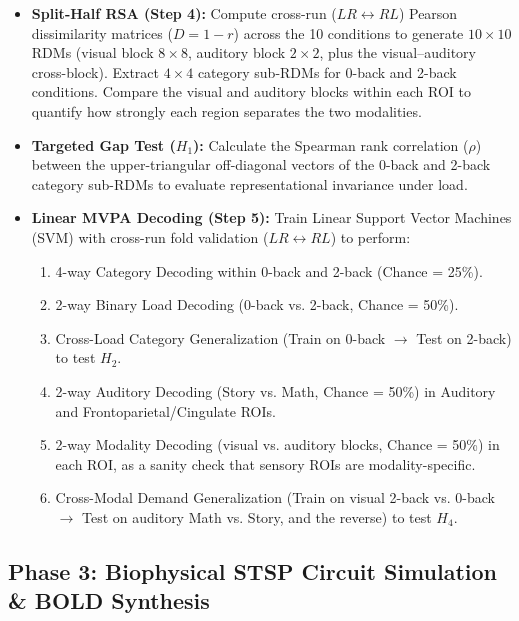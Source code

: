 \documentclass[11pt,a4paper]{article}
\begin{document}
\begin{itemize}
    \item \textbf{Split-Half RSA (Step 4):} Compute cross-run ($LR \leftrightarrow RL$) Pearson dissimilarity matrices ($D = 1 - r$) across the 10 conditions to generate $10 \times 10$ RDMs (visual block $8 \times 8$, auditory block $2 \times 2$, plus the visual--auditory cross-block). Extract $4 \times 4$ category sub-RDMs for 0-back and 2-back conditions. Compare the visual and auditory blocks within each ROI to quantify how strongly each region separates the two modalities.
    \item \textbf{Targeted Gap Test ($H_1$):} Calculate the Spearman rank correlation ($\rho$) between the upper-triangular off-diagonal vectors of the 0-back and 2-back category sub-RDMs to evaluate representational invariance under load.
    \item \textbf{Linear MVPA Decoding (Step 5):} Train Linear Support Vector Machines (SVM) with cross-run fold validation ($LR \leftrightarrow RL$) to perform:
    \begin{enumerate}
        \item 4-way Category Decoding within 0-back and 2-back (Chance = 25\%).
        \item 2-way Binary Load Decoding (0-back vs. 2-back, Chance = 50\%).
        \item Cross-Load Category Generalization (Train on 0-back $\rightarrow$ Test on 2-back) to test $H_2$.
        \item 2-way Auditory Decoding (Story vs. Math, Chance = 50\%) in Auditory and Frontoparietal/Cingulate ROIs.
        \item 2-way Modality Decoding (visual vs. auditory blocks, Chance = 50\%) in each ROI, as a sanity check that sensory ROIs are modality-specific.
        \item Cross-Modal Demand Generalization (Train on visual 2-back vs. 0-back $\rightarrow$ Test on auditory Math vs. Story, and the reverse) to test $H_4$.
    \end{enumerate}
\end{itemize}

\subsection{Phase 3: Biophysical STSP Circuit Simulation \& BOLD Synthesis}
\end{document}
